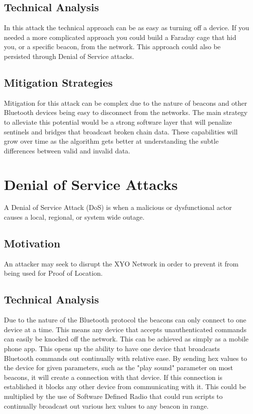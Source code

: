 \documentclass{article}
\begin{document}
\subsection{Technical Analysis}
In this attack the technical approach can be as easy as turning off a device. If you needed a more complicated approach you could build a Faraday cage that hid you, or a specific beacon, from the network. This approach could also be persisted through Denial of Service attacks. 

\subsection{Mitigation Strategies}
Mitigation for this attack can be complex due to the nature of beacons and other Bluetooth devices being easy to disconnect from the networks. The main strategy to alleviate this potential would be a strong software layer that will penalize sentinels and bridges that broadcast broken chain data. These capabilities will grow over time as the algorithm gets better at understanding the subtle differences between valid and invalid data. 

\section{Denial of Service Attacks}
A Denial of Service Attack (DoS) is when a malicious or dysfunctional actor causes a local, regional, or system wide outage. 

\subsection{Motivation}

An attacker may seek to disrupt the XYO Network in order to prevent it from being used for Proof of Location.

\subsection{Technical Analysis}
Due to the nature of the Bluetooth protocol the beacons can only connect to one device at a time. This means any device that accepts unauthenticated commands can easily be knocked off the network. This can be achieved as simply as a mobile phone app. This opens up the ability to have one device that broadcasts Bluetooth commands out continually with relative ease. By sending hex values to the device for given parameters, such as the "play sound" parameter on most beacons, it will create a connection with that device. If this connection is established it blocks any other device from communicating with it. This could be multiplied by the use of Software Defined Radio that could run scripts to continually broadcast out various hex values to any beacon in range. 
\end{document}
